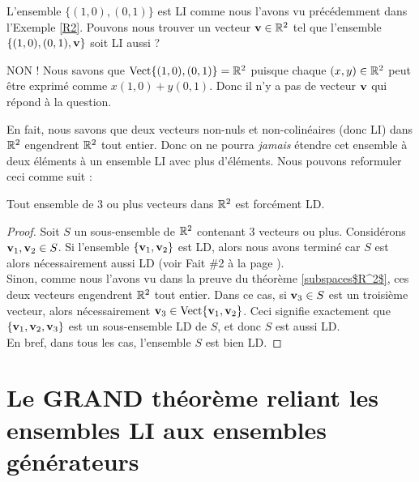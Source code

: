 \begin{myprob} L'ensemble $\{(1,0), (0,1)\}$ est LI comme nous l'avons vu précédemment dans l'Exemple \ref{R2}.
Pouvons nous trouver un vecteur $\mathbf{v} \in \mathbb{R}^2$ tel que l'ensemble $\{(1,0), (0,1), \mathbf{v}\}$ soit
LI aussi ?

\begin{mysol} NON !  Nous savons que $\textrm{Vect}\{ (1,0), (0,1) \} = \mathbb{R}^2$ puisque
chaque $(x,y)\in \mathbb{R}^2$ peut être exprimé comme $x(1,0)+y(0,1)$.
Donc il n'y a pas de vecteur $\mathbf{v}$ qui r\'epond à la question. \end{mysol}\end{myprob}

En fait, nous savons que deux vecteurs non-nuls et non-colinéaires (donc LI) dans $\mathbb{R}^2$ engendrent $\mathbb{R}^2$ tout entier. Donc on ne pourra \emph{jamais} \'etendre cet ensemble à deux éléments \`a un ensemble LI avec plus d'éléments.  Nous pouvons reformuler ceci comme suit :

\begin{fac}  Tout ensemble de $3$ ou plus vecteurs dans $\mathbb{R}^2$ est forcément LD. \end{fac}

\begin{proof} Soit $S$ un sous-ensemble de $\mathbb{R}^2$ contenant $3$ vecteurs ou plus. Considérons $\mathbf{v}_1, \mathbf{v}_2 \in S$.
Si l'ensemble $\{\mathbf{v}_1, \mathbf{v}_2\}$ est LD, alors nous avons terminé car $S$ est alors nécessairement aussi LD (voir Fait \#2 à la page \pageref{fact 2}). \\
Sinon, comme nous l'avons vu dans la preuve du théorème \ref{subspaces$R^2$}, ces deux vecteurs engendrent $\mathbb{R}^2$ tout entier. 
Dans ce cas, si $\mathbf{v}_3 \in S$ est un troisième vecteur, alors nécessairement $\mathbf{v}_3 \in \textrm{Vect}\{\mathbf{v}_1,\mathbf{v}_2\}$.  
Ceci signifie exactement que $\{\mathbf{v}_1,\mathbf{v}_2,\mathbf{v}_3\}$ est un sous-ensemble LD de $S$, et donc $S$ est aussi LD. \\
En bref, dans tous les cas, l'ensemble $S$ est bien LD. \end{proof}


\section[Grand théorème : ensembles LI et ensembles gén\'erateurs]{Le GRAND théorème reliant les ensembles LI aux ensembles gén\'erateurs}

